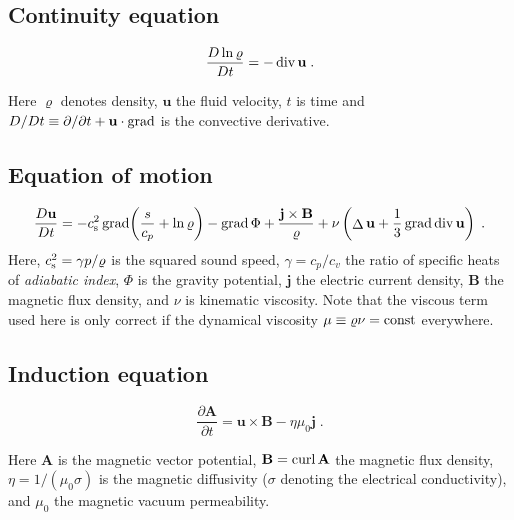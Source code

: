\documentclass[12pt,twoside,notitlepage,a4paper]{article}
\newcommand{\grad}    {\mathop{\rm grad}\nolimits}
\newcommand{\Div}     {\mathop{\rm div}\nolimits}
\newcommand{\curl}    {\mathop{\rm curl}\nolimits}
\newcommand{\Laplace} {\mathop{\Delta}\nolimits}
\newcommand{\vekt}[1] {\mathbf{#1}}
\newcommand{\const}   {\mbox{\rm const}}
\newcommand{\Av}            {\vekt{A}}
\newcommand{\Bv}            {\vekt{B}}
\newcommand{\cs}            {c_{\rm s}}
\newcommand{\jv}            {\vekt{j}}
\newcommand{\uv}            {\vekt{u}}
\begin{document}

\subsection{Continuity equation}

\begin{equation}
  \frac{D\ln\varrho}{Dt}
  = - \Div\uv \; .
\end{equation}

Here $\varrho$ denotes density, $\uv$ the fluid velocity, $t$ is time and
$D/Dt \equiv \partial/\partial t + \uv\cdot\grad$ is the convective
derivative.


\subsection{Equation of motion}

\begin{equation}
  \frac{D\uv}{Dt}
   =  -\cs^2\grad\biggl(\frac{s}{c_p} + \ln\varrho\biggr)
      - \grad\Phi
      + \frac{\jv\times\Bv}{\varrho}
      + \nu \left( \Laplace\uv + \frac{1}{3}\grad\Div\uv \right) \; .
\end{equation}
Here, $\cs^2 = \gamma p/\varrho$ is the squared sound speed,
$\gamma=c_p/c_v$ the ratio of specific heats of \emph{adiabatic index},
$\Phi$ is the gravity potential, $\jv$ the electric current density, $\Bv$
the magnetic flux density, and $\nu$ is kinematic viscosity.
Note that the viscous term used here is only correct if the dynamical
viscosity $\mu \equiv \varrho\nu = \const$ everywhere.


\subsection{Induction equation}

\begin{equation}
  \frac{\partial\Av}{\partial t}
  = \uv\times\Bv - \eta\mu_0\jv \; .
\end{equation}

Here $\Av$ is the magnetic vector potential,
$\Bv = \curl\Av$ the magnetic
flux density, $\eta = 1/(\mu_0\sigma)$ is the magnetic diffusivity
($\sigma$ denoting the electrical conductivity), and $\mu_0$ the
magnetic vacuum permeability.
\end{document}
